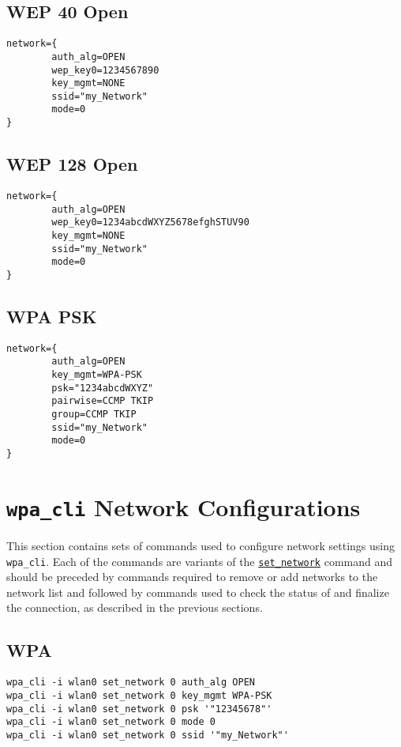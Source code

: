 \subsection{WEP 40 Open}
\begin{lstlisting}[style=text]
network={
        auth_alg=OPEN
        wep_key0=1234567890
        key_mgmt=NONE
        ssid="my_Network"
        mode=0
}
\end{lstlisting}

\newpage
\subsection{WEP 128 Open}
\begin{lstlisting}[style=text]
network={
        auth_alg=OPEN
        wep_key0=1234abcdWXYZ5678efghSTUV90
        key_mgmt=NONE
        ssid="my_Network"
        mode=0
}
\end{lstlisting}

\subsection{WPA PSK}
\begin{lstlisting}[style=text]
network={
        auth_alg=OPEN
        key_mgmt=WPA-PSK
        psk="1234abcdWXYZ"
        pairwise=CCMP TKIP
        group=CCMP TKIP
        ssid="my_Network"
        mode=0
}
\end{lstlisting}



\section{\texttt{wpa\_cli} Network Configurations}
\label{sec:wpacliconfigs}
This section contains sets of commands used to configure network settings using \texttt{wpa\_cli}. Each of the commands are variants of the \hyperref[sub:setnetwork]{\texttt{set\_network}} command and should be preceded by commands required to remove or add networks to the network list and followed by commands used to check the status of and finalize the connection, as described in the previous sections.

\subsection{WPA}
\begin{lstlisting}[style=text]
wpa_cli -i wlan0 set_network 0 auth_alg OPEN
wpa_cli -i wlan0 set_network 0 key_mgmt WPA-PSK
wpa_cli -i wlan0 set_network 0 psk '"12345678"'
wpa_cli -i wlan0 set_network 0 mode 0
wpa_cli -i wlan0 set_network 0 ssid '"my_Network"'
\end{lstlisting}

